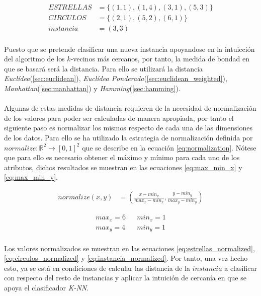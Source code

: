 \documentclass{article}
\begin{document}
		\begin{align}
		\label{eq:estrellas}
			ESTRELLAS &= \{(1,1), (1,4), (3,1), (5,3)\} \\
		\label{eq:circulos}
			CIRCULOS &= \{(2,1), (5,2), (6,1)\} \\
		\label{eq:instancia}
			instancia &= (3,3)
		\end{align}

		\paragraph{}
		Puesto que se pretende clasificar una nueva instancia apoyandose en la intuicción del algoritmo de los $k$-vecinos más cercanos, por tanto, la medida de bondad en que se basará será la distancia. Para ello se utilizará la distancia \emph{Euclídea}(\ref{sec:euclidean}), \emph{Euclídea Ponderada}(\ref{sec:euclidean_weighted}), \emph{Manhattan}(\ref{sec:manhattan}) y \emph{Hamming}(\ref{sec:hamming}).


		\paragraph{}
		Algunas de estas medidas de distancia requieren de la necesidad de normalización de los valores para poder ser calculadas de manera apropiada, por tanto el siguiente paso es normalizar los mismos respecto de cada una de las dimensiones de los datos. Para ello se ha utilizado la estrategia de normalización definida por $normalize \colon \mathbb{R}^2 \to [0,1]^2$ que se describe en la ecuación \eqref{eq:normalization}. Nótese que para ello es necesario obtener el máximo y mínimo para cada uno de los atributos, dichos resultados se muestran en las ecuaciones \eqref{eq:max_min_x} y \eqref{eq:max_min_y}.

		\begin{align}
		\label{eq:normalization}
			normalize(x,y) &= (\frac{x-min_x}{max_x-min_x},\frac{y-min_y}{max_y-min_y})
		\end{align}

		\begin{align}
		\label{eq:max_min_x}
			max_x = 6 && min_x = 1 \\
		\label{eq:max_min_y}
			max_y = 4 && min_y = 1
		\end{align}

		\paragraph{}
		Los valores normalizados se muestran en las ecuaciones \eqref{eq:estrellas_normalized}, \eqref{eq:circulos_normalized} y \eqref{eq:instancia_normalized}. Por tanto, una vez hecho esto, ya se está en condiciones de calcular las distancia de la $instancia$ a clasificar con respecto del resto de instancias y aplicar la intuición de cercanía en que se apoya el clasificador \emph{K-NN}.
\end{document}
